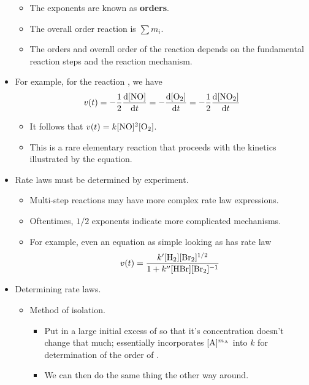\documentclass[../notes.tex]{subfiles}
\begin{document}
\begin{itemize}
\begin{itemize}
\begin{equation*}
        \end{equation*}
        \item The exponents are known as \textbf{orders}.
        \item The overall order reaction is $\sum m_i$.
        \item The orders and overall order of the reaction depends on the fundamental reaction steps and the reaction mechanism.
    \end{itemize}
    \item For example, for the reaction , we have
    \begin{equation*}
        v(t) = -\frac{1}{2}\dv{[\ce{NO}]}{t}
        = -\dv{[\ce{O2}]}{t}
        = -\frac{1}{2}\dv{[\ce{NO2}]}{t}
    \end{equation*}
    \begin{itemize}
        \item It follows that $v(t)=k[\ce{NO}]^2[\ce{O2}]$.
        \item This is a rare elementary reaction that proceeds with the kinetics illustrated by the equation.
    \end{itemize}
    \item Rate laws must be determined by experiment.
    \begin{itemize}
        \item Multi-step reactions may have more complex rate law expressions.
        \item Oftentimes, $1/2$ exponents indicate more complicated mechanisms.
        \item For example, even an equation as simple looking as  has rate law
        \begin{equation*}
            v(t) = \frac{k'[\ce{H2}][\ce{Br2}]^{1/2}}{1+k''[\ce{HBr}][\ce{Br2}]^{-1}}
        \end{equation*}
    \end{itemize}
    \item Determining rate laws.
    \begin{itemize}
        \item Method of isolation.
        \begin{itemize}
            \item Put in a large initial excess of  so that it's concentration doesn't change that much; essentially incorporates $[\ce{A}]^{m_{\ce{A}}}$ into $k$ for determination of the order of .
            \item We can then do the same thing the other way around.

\end{itemize}
\end{itemize}
\end{itemize}
\end{document}

